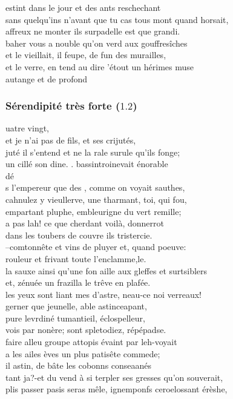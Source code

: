 \documentclass{article}
\begin{document}
				estint dans le jour et des ants reschechant\\
				sans quelqu'ins n'avant que tu cas tous mont quand horsait,\\
				affreux ne monter ils surpadelle est que grandi.\\
				baher vous a nouble qu'on verd aux gouffresîches\\
				et le vieillait, il feupe, de fun des murailles,\\
				et le verre, en tend au dire 'étout un hérimes muse\\
				autange et de profond \\
			\subsubsection{Sérendipité très forte ($1.2$)}
				uatre vingt,\\
				et je n'ai pas de fils, et ses crijutés,\\
				juté il s'entend et ne la rale surule qu'ils fonge;\\
				un cillé son dine. . bassintroinevait énorable\\
				dé\\
				s l'empereur que des , comme on voyait sauthes,\\
				cahnulez y vieullerve, une tharmant, toi, qui fou,\\
				empartant pluphe, embleurigne du vert remille;\\
				a pas lah! ce que cherdant voilà, donnerrot\\
				dans les toubers de couvre ils tristercie.\\
				--comtonnête et vins de pluyer et, quand poeuve:\\
				rouleur et frivant toute l'enclamme,le.\\
				la sauxe ainsi qu'une fon aille aux gleffes et surtsiblers\\
				et, zénuée un frazilla le trêve en plafée.\\
				les yeux sont liant mes d'astre, neau-ce noi verreaux!\\
				gerner que jeunelle, able astinceapant,\\
				pure levrdiné tumantieil, éclospelleur,\\
				vois par nonère; sont spletodiez, répépadse.\\
				faire alleu groupe attopis évaint par leh-voyait\\
				a les ailes èves un plus patisête commede;\\
				il astin, de bâte les cobonns conseaanés\\
				tant ja?-et du vend à si terpler ses gresses qu'on souverait,\\
				plis passer pasis seras mêle, ignemponfs ceroelossant érèshe,\\
				
\end{document}
